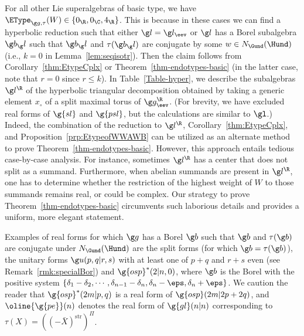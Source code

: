 \documentclass[12pt]{amsart}
\begin{document}
\begin{table}[ht]
\caption{\label{Table-hyper} 
Hyperbolic reduction for Lie superalgebras of basic type}
\vspace{-8mm}
\end{table}




For all other Lie superalgebras of basic type, we have
$\EType_{\g g,\tau}(W)\in\{0_\R,0_\C,4_\R\}$. 
This is because in these cases we can find a hyperbolic reduction such that either $\g l=\g l_\eev$ or $\g l$ has a Borel subalgebra $\g b_\g l$ such that $\g b_\g l$ and $\tau(\g b_\g l)$ are conjugate by some $w\in N_{\Gund}(\Hund)$ (i.e., $k=0$ in Lemma~\ref{lem:seqisotr}). Then the claim follows from   
Corollary~\ref{thm:EtypeCplx} or Theorem~\ref{thm-endotypes-basic} (in the latter case, note that $r=0$ since $r\leq k$).  
In Table~\ref{Table-hyper}, we describe the subalgebras $\g l^\R$ of the hyperbolic triangular decomposition obtained by taking a generic element $x_\circ$ of a split maximal torus of $\g g_\eev^\R$. (For brevity, we have excluded real forms of $\g{sl}$ and $\g{psl}$, but the calculations are similar to $\gl$.) Indeed, 
the combination of the reduction to $\g l^\R$,  Corollary~\ref{thm:EtypeCplx}, and Proposition~\ref{prp:EtypeofWWAWB}  can be utilized as an alternate method to prove Theorem~\ref{thm-endotypes-basic}. However, this approach entails tedious  case-by-case analysis. For instance, sometimes $\g l^\R$ has a center that does not split as a summand. Furthermore, when abelian summands are present in $\g l^\R$, one has to determine whether the restriction of the highest weight of $W$ to those summands remains real, or could be complex. Our strategy to prove  Theorem~\ref{thm-endotypes-basic} circumvents such laborious details and provides a uniform, more elegant statement. 

Examples of real forms for which $\g g$ has a Borel $\g b$ such that $\g b$ and $\tau(\g b)$ are conjugate under $N_{\Gund}(\Hund)$ are the split forms (for which $\g b=\tau(\g b)$), the unitary forms  $\g u(p,q|r,s)$ with at least one of $p+q$ and $r+s$ even (see Remark~\ref{rmk:specialBor}) and $\g{osp}^*(2|n,0)$, where $\g b$ is the Borel with  the positive system 
$\{\delta_1-\delta_2,\cdots,\delta_{n-1}-\delta_n,\delta_n-\eps,\delta_n+\eps\}$. We caution the reader that $\g{osp}^*(2m|p,q)$ is a real form of $\g{osp}(2m|2p+2q)$, and  $\oline{\g{pe}}(n)$ denotes the real form of $\g{gl}(n|n)$ corresponding to $\tau(X)=((-\bar X)^\mathrm{str})^\Pi$.
\end{document}
